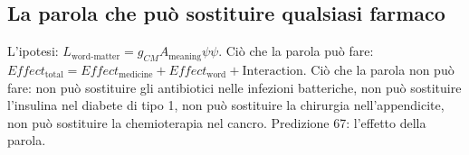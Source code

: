 \subsection{La parola che può sostituire qualsiasi farmaco}
L'ipotesi: $L_{\text{word-matter}} = g_{CM} A_{\text{meaning}} \psi \psi$. Ciò che la parola può fare: $Effect_{\text{total}} = Effect_{\text{medicine}} + Effect_{\text{word}} + \text{Interaction}$. Ciò che la parola non può fare: non può sostituire gli antibiotici nelle infezioni batteriche, non può sostituire l'insulina nel diabete di tipo 1, non può sostituire la chirurgia nell'appendicite, non può sostituire la chemioterapia nel cancro. Predizione 67: l'effetto della parola.

\newpage
